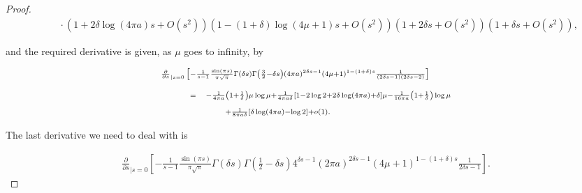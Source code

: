 \documentclass{jams-l}
\theoremstyle{definition}
\theoremstyle{remark}
\numberwithin{equation}{section}
\begin{document}
\begin{proof}
\[\begin{array}{lll}
                        && \scriptstyle \quad \cdot \left( 1 + 2 \delta \log \left( 4 \pi a \right) s + O \left( s^2 \right) \right) \left( 1 - \left( 1 + \delta \right) \log \left( 4 \mu + 1 \right) s + O \left( s^2 \right) \right) \left( 1 + 2 \delta s + O \left( s^2 \right) \right) \left( 1 + \delta s + O \left( s^2 \right) \right),
                    \end{array} \]
                
                \noindent and the required derivative is given, as $\mu$ goes to infinity, by
                
                \[ \begin{array}{lll}
                        \multicolumn{3}{l}{\scriptstyle \frac{\partial}{\partial s}_{\left \vert s = 0 \right.} \left[ - \frac{1}{s-1} \frac{\sin \left( \pi s \right)}{\pi \sqrt{\pi}} \Gamma \left( \delta s \right) \Gamma \left( \frac{3}{2} - \delta s \right) \left( 4 \pi a \right)^{2 \delta s - 1} \left( 4 \mu + 1 \right)^{1 - \left( 1+\delta \right) s} \frac{1}{\left( 2 \delta s - 1 \right) \left( 2 \delta s - 2 \right)} \right]} \\[1em]
                        
                        \qquad & \scriptstyle = & \scriptstyle - \frac{1}{4 \pi a} \left( 1 + \frac{1}{\delta} \right) \mu \log \mu + \frac{1}{4 \pi a \delta} \left[ 1 - 2 \log 2 + 2 \delta \log \left( 4 \pi a \right) + \delta \right] \mu - \frac{1}{16 \pi a} \left( 1 + \frac{1}{\delta} \right) \log \mu \\[0.5em]
                        
                        && \scriptstyle \qquad + \frac{1}{8 \pi a \delta} \left[ \delta \log \left( 4 \pi a \right) - \log 2 \right] + o \left( 1 \right).
                    \end{array} \]
                
                \noindent The last derivative we need to deal with is
                
                \[ \begin{array}{c}
                        \frac{\partial}{\partial s}_{\left \vert s = 0 \right.} \left[ - \frac{1}{s-1} \frac{\sin \left( \pi s \right)}{\pi \sqrt{\pi}} \Gamma \left( \delta s \right) \Gamma \left( \frac{1}{2} - \delta s \right) 4^{\delta s - 1} \left( 2 \pi a \right)^{2 \delta s - 1} \left( 4 \mu + 1 \right)^{1 - \left( 1+\delta \right) s} \frac{1}{2 \delta s - 1} \right].
                    \end{array} \]
                

\end{proof}
\end{document}
